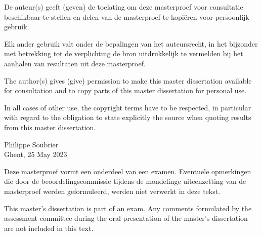 \hspace{6cm}

De auteur(s) geeft (geven) de toelating om deze masterproef voor consultatie
beschikbaar te stellen en delen van de masterproef te kopiëren voor persoonlijk
gebruik.

Elk ander gebruik valt onder de bepalingen van het auteursrecht, in het bijzonder met
betrekking tot de verplichting de bron uitdrukkelijk te vermelden bij het aanhalen van
resultaten uit deze masterproef.

\vspace{1cm}

The author(s) gives (give) permission to make this master dissertation available for
consultation and to copy parts of this master dissertation for personal use.

In all cases of other use, the copyright terms have to be respected, in particular with
regard to the obligation to state explicitly the source when quoting results from this
master dissertation.

\vspace{2cm}
\begin{flushright}
  Philippe Soubrier\\
  Ghent, 25 May 2023
\end{flushright}

\vfill

Deze masterproef vormt een onderdeel van een examen. Eventuele opmerkingen die door de beoordelingscommissie tijdens de mondelinge uiteenzetting van de masterproef werden geformuleerd, werden niet verwerkt in deze tekst.

This master's dissertation is part of an exam. Any comments formulated by the assessment committee during the oral presentation of the master's dissertation are not included in this text.